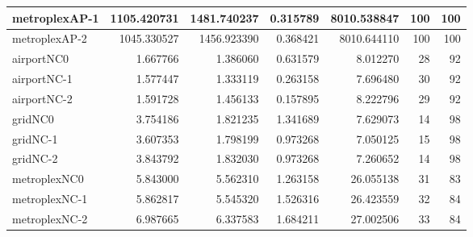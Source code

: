 \begin{longtable}{|l|r|r|r|r|r|r|}
metroplexAP-1 & 1105.420731 & 1481.740237 & 0.315789 & 8010.538847 & 100 & 100 \\ \hline
metroplexAP-2 & 1045.330527 & 1456.923390 & 0.368421 & 8010.644110 & 100 & 100 \\ \hline
airportNC0 & 1.667766 & 1.386060 & 0.631579 & 8.012270 & 28 & 92 \\ \hline
airportNC-1 & 1.577447 & 1.333119 & 0.263158 & 7.696480 & 30 & 92 \\ \hline
airportNC-2 & 1.591728 & 1.456133 & 0.157895 & 8.222796 & 29 & 92 \\ \hline
gridNC0 & 3.754186 & 1.821235 & 1.341689 & 7.629073 & 14 & 98 \\ \hline
gridNC-1 & 3.607353 & 1.798199 & 0.973268 & 7.050125 & 15 & 98 \\ \hline
gridNC-2 & 3.843792 & 1.832030 & 0.973268 & 7.260652 & 14 & 98 \\ \hline
metroplexNC0 & 5.843000 & 5.562310 & 1.263158 & 26.055138 & 31 & 83 \\ \hline
metroplexNC-1 & 5.862817 & 5.545320 & 1.526316 & 26.423559 & 32 & 84 \\ \hline
metroplexNC-2 & 6.987665 & 6.337583 & 1.684211 & 27.002506 & 33 & 84 \\ \hline
\end{longtable}
